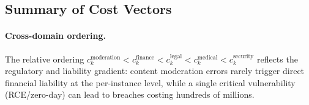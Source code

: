 \subsection{Summary of Cost Vectors}

\begin{table}[h]
\centering
{}%
\caption{Cost vectors by domain. Each vector spans three orders of
magnitude, reflecting the empirical observation that financial exposure
from errors follows a heavy-tailed distribution within each domain.}
\label{tab:cost-vectors}
\end{table}

\paragraph{Cross-domain ordering.}
The relative ordering $c_k^{\text{moderation}} < c_k^{\text{finance}}
< c_k^{\text{legal}} < c_k^{\text{medical}} < c_k^{\text{security}}$
reflects the regulatory and liability gradient: content moderation
errors rarely trigger direct financial liability at the per-instance
level, while a single critical vulnerability (RCE/zero-day) can lead
to breaches costing hundreds of millions.
